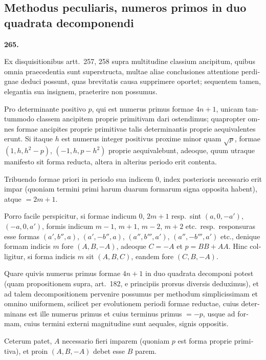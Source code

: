 \documentclass[12pt,a4paper]{article}
\theoremstyle{plain}
\theoremstyle{definition}
\theoremstyle{remark}
\begin{document}
\begin{otherlanguage}{latin}

\subsection*{Methodus peculiaris, numeros primos in duo quadrata decomponendi}

\textbf{265.}

Ex disquisitionibus artt.\ 257, 258 supra multitudine classium ancipitum, quibus omnia praecedentia sunt superstructa, multae aliae conclusiones attentione perdignae deduci possunt, quas brevitatis causa supprimere oportet; sequentem tamen, elegantia sua insignem, praeterire non possumus.

Pro determinante positivo $p$, qui est numerus primus formae $4n+1$, unicam tantummodo classem ancipitem proprie primitivam dari ostendimus; quapropter omnes formae ancipites proprie primitivae talis determinantis proprie aequivalentes erunt. Si itaque $h$ est numerus integer positivus proxime minor quam $\sqrt{p}$, formae $(1, h, h^2-p)$, $(-1, h, p-h^2)$ proprie aequivalebunt, adeoque, quum utraque manifesto sit forma reducta, altera in alterius periodo erit contenta.

Tribuendo formae priori in periodo sua indicem $0$, index posterioris necessario erit impar (quoniam termini primi harum duarum formarum signa opposita habent), atque $= 2m+1$.

Porro facile perspicitur, si formae indicum $0$, $2m+1$ resp.\ sint $(a, 0, -a')$, $(-a, 0, a')$, formis indicum $m-1$, $m+1$, $m-2$, $m+2$ etc.\ resp.\ responsuras esse formas $(a', b'', a)$, $(a', -b'', a)$, $(a'', b''', a')$, $(a'', -b''', a')$ etc., denique formam indicis $m$ fore $(A, B, -A)$, adeoque $C = -A$ et $p = BB + AA$. Hinc colligitur, si forma indicis $m$ sit $(A, B, C)$, eandem fore $(C, B, -A)$.

Quare quivis numerus primus formae $4n+1$ in duo quadrata decomponi potest (quam propositionem supra, art.\ 182, e principiis prorsus diversis deduximus), et ad talem decompositionem pervenire possumus per methodum simplicissimam et omnino uniformem, scilicet per evolutionem periodi formae reductae, cuius determinans est ille numerus primus et cuius terminus primus $= -p$, usque ad formam, cuius termini externi magnitudine sunt aequales, signis oppositis.

Ceterum patet, $A$ necessario fieri imparem (quoniam $p$ est forma proprie primitiva), et proin $(A, B, -A)$ debet esse $B$ parem.


\end{otherlanguage}
\end{document}
